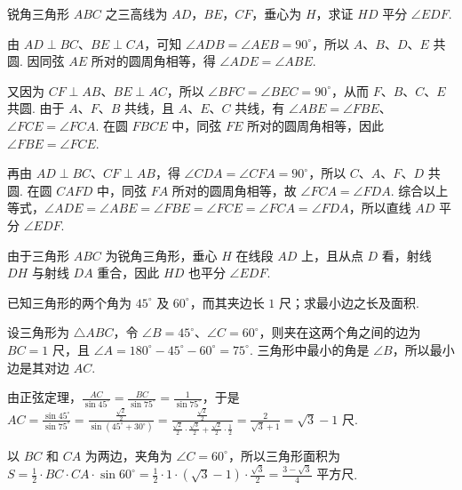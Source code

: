 \documentclass[UTF8,a4paper,oneside,11pt]{ctexbook}
\begin{document}
\begin{problem}
锐角三角形 \(ABC\) 之三高线为 \(AD\)，\(BE\)，\(CF\)，垂心为 \(H\)，求证 \(HD\) 平分 \(\angle EDF\).
\end{problem}

\begin{solution}
由 \(AD\perp BC\)、\(BE\perp CA\)，可知 \(\angle ADB=\angle AEB=90^{\circ}\)，所以 \(A\)、\(B\)、\(D\)、\(E\) 共圆. 因同弦 \(AE\) 所对的圆周角相等，得 \(\angle ADE=\angle ABE\).

又因为 \(CF\perp AB\)、\(BE\perp AC\)，所以 \(\angle BFC=\angle BEC=90^{\circ}\)，从而 \(F\)、\(B\)、\(C\)、\(E\) 共圆. 由于 \(A\)、\(F\)、\(B\) 共线，且 \(A\)、\(E\)、\(C\) 共线，有 \(\angle ABE=\angle FBE\)、\(\angle FCE=\angle FCA\). 在圆 \(FBCE\) 中，同弦 \(FE\) 所对的圆周角相等，因此 \(\angle FBE=\angle FCE\).

再由 \(AD\perp BC\)、\(CF\perp AB\)，得 \(\angle CDA=\angle CFA=90^{\circ}\)，所以 \(C\)、\(A\)、\(F\)、\(D\) 共圆. 在圆 \(CAFD\) 中，同弦 \(FA\) 所对的圆周角相等，故 \(\angle FCA=\angle FDA\). 综合以上等式，\(\angle ADE=\angle ABE=\angle FBE=\angle FCE=\angle FCA=\angle FDA\)，所以直线 \(AD\) 平分 \(\angle EDF\).

由于三角形 \(ABC\) 为锐角三角形，垂心 \(H\) 在线段 \(AD\) 上，且从点 \(D\) 看，射线 \(DH\) 与射线 \(DA\) 重合，因此 \(HD\) 也平分 \(\angle EDF\).

\end{solution}

\begin{problem}
已知三角形的两个角为 \(45^{\circ}\) 及 \(60^{\circ}\)，而其夹边长 \(1\text{ 尺}\)；求最小边之长及面积.
\end{problem}

\begin{solution}
设三角形为 \(\triangle ABC\)，令 \(\angle B=45^{\circ}\)、\(\angle C=60^{\circ}\)，则夹在这两个角之间的边为 \(BC=1\text{ 尺}\)，且 \(\angle A=180^{\circ}-45^{\circ}-60^{\circ}=75^{\circ}\). 三角形中最小的角是 \(\angle B\)，所以最小边是其对边 \(AC\).

由正弦定理，\(\frac{AC}{\sin45^{\circ}}=\frac{BC}{\sin75^{\circ}}=\frac{1}{\sin75^{\circ}}\)，于是
\(AC=\frac{\sin45^{\circ}}{\sin75^{\circ}}=\frac{\frac{\sqrt2}{2}}{\sin\left(45^{\circ}+30^{\circ}\right)}=\frac{\frac{\sqrt2}{2}}{\frac{\sqrt2}{2}\cdot\frac{\sqrt3}{2}+\frac{\sqrt2}{2}\cdot\frac12}=\frac{2}{\sqrt3+1}=\sqrt3-1\text{ 尺}\).

以 \(BC\) 和 \(CA\) 为两边，夹角为 \(\angle C=60^{\circ}\)，所以三角形面积为 \(S=\frac12\cdot BC\cdot CA\cdot\sin60^{\circ}=\frac12\cdot1\cdot\left(\sqrt3-1\right)\cdot\frac{\sqrt3}{2}=\frac{3-\sqrt3}{4}\text{ 平方尺}\).
\end{solution}

\end{document}
